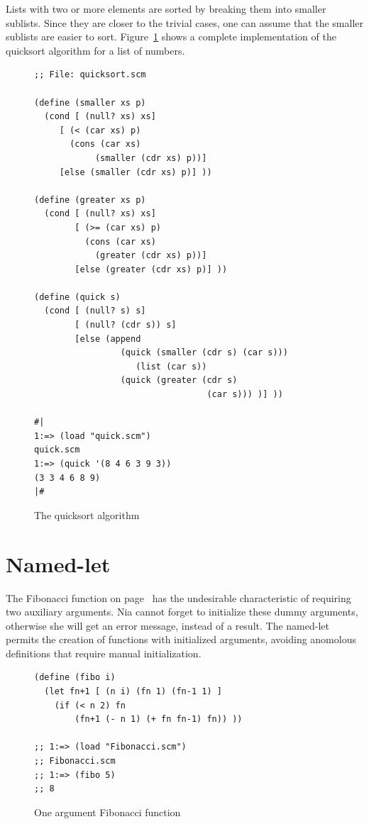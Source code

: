 \documentclass[a4paper,12pt]{book}
\begin{document}
Lists with two or more elements
are sorted by breaking them into
smaller sublists. Since they are
closer to the trivial cases,
one can assume that the smaller sublists
are easier to sort. Figure~\ref{quicksort} shows
a complete implementation of the quicksort algorithm
for a list of numbers.


\begin{figure}[!h]
\begin{verbatim}
;; File: quicksort.scm

(define (smaller xs p)
  (cond [ (null? xs) xs]
     [ (< (car xs) p)
       (cons (car xs)
            (smaller (cdr xs) p))]
     [else (smaller (cdr xs) p)] ))

(define (greater xs p)
  (cond [ (null? xs) xs]
        [ (>= (car xs) p)
          (cons (car xs)
            (greater (cdr xs) p))]
        [else (greater (cdr xs) p)] )) 

(define (quick s)
  (cond [ (null? s) s]
        [ (null? (cdr s)) s]
        [else (append 
                 (quick (smaller (cdr s) (car s)))
                    (list (car s))
                 (quick (greater (cdr s)
                                  (car s))) )] ))

#|
1:=> (load "quick.scm")
quick.scm
1:=> (quick '(8 4 6 3 9 3))
(3 3 4 6 8 9)
|#
\end{verbatim}

\caption{The quicksort algorithm}
\label{quicksort}
\end{figure}

\section{Named-let}

The Fibonacci function on
page~\pageref{page:Fibonacci} has the
undesirable characteristic of
requiring two auxiliary arguments.
Nia cannot forget to initialize
these dummy arguments, otherwise
she will get an error message,
instead of a result. 
The named-let
permits the creation of functions
with initialized arguments, avoiding
anomolous definitions 
that require manual initialization.

\begin{figure}[!h]
\begin{verbatim}
(define (fibo i)
  (let fn+1 [ (n i) (fn 1) (fn-1 1) ]
    (if (< n 2) fn
        (fn+1 (- n 1) (+ fn fn-1) fn)) ))

;; 1:=> (load "Fibonacci.scm")
;; Fibonacci.scm
;; 1:=> (fibo 5)
;; 8
\end{verbatim}

\caption{One argument Fibonacci function}
\label{oneargfib}
\end{figure}
\end{document}
